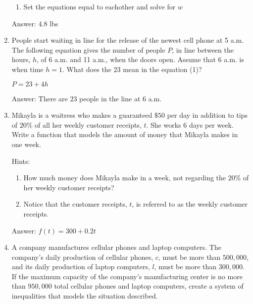 \documentclass{article}
\begin{document}
\begin{enumerate}
{\begin{enumerate}
{			            \[
				            \begin{array}{l}
					            \begin{cases}
						            c=10w+112 & \\
						            c=12.5(w+8)
					            \end{cases}
				            \end{array}
			            \]
			            }
			      \item {Set the equations equal to eachother and solve for $w$}
		      \end{enumerate}
		      Answer: $4.8$ lbs
	      }

	\item {People start waiting in line for the release of the newest cell phone at 5 a.m. The following equation gives the number of people $P$, in line between the hours, $h$, of 6 a.m. and 11 a.m., when the doors open. Assume that 6 a.m. is when time $h=1$. What does the $23$ mean in the equation (1)?

	      \(P=23+4h\)

	      Answer: There are $23$ people in the line at 6 a.m.}

	\item {Mikayla is a waitress who makes a guaranteed $\$50$ per day in addition to tips of $20\%$ of all her weekly customer receipts, $t$. She works $6$ days per week. Write a function that models the amount of money that Mikayla makes in one week.

	      Hints:
	      \begin{enumerate}
		      \item{How much money does Mikayla make in a week, not regarding the $20\%$ of her weekly customer receipts?}
		      \item{Notice that the customer receipts, $t$, is referred to as the weekly customer receipts.}
	      \end{enumerate}

	      Answer: \(f(t)=300+0.2t\)}

	\item{A company manufactures cellular phones and laptop computers. The company's daily production of cellular phones, $c$, must be more than $500,000$, and its daily production of laptop computers, $l$, must be more than $300,000$. If the maximum capacity of the company's manufacturing center is no more than $950,000$ total cellular phones and laptop computers, create a system of inequalities that models the situation described.

}
\end{enumerate}
\end{document}
